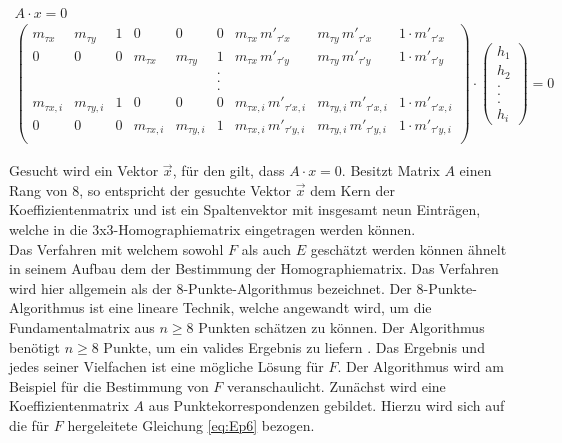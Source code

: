 \begin{gather}
		A\cdot x = 0\\
	\begin{pmatrix}
		m_{\tau x}&m_{\tau y}&1&0&0&0&m_{\tau x}\, m'_{\tau' x}&m_{\tau y} \,m'_{\tau'x} & 1\cdot m'_{\tau'x}\\
		0&0&0&m_{\tau x}&m_{\tau y}&1&m_{\tau x}\, m'_{\tau' y}&m_{\tau y}\, m'_{\tau'y} & 1\cdot m'_{\tau'y}\\
		&&&&&.&&&\\	
		&&&&&.&&&\\	
		&&&&&.&&&\\	
		m_{\tau x,i}&m_{\tau y,i}&1&0&0&0&m_{\tau x,i}\, m'_{\tau'x,i}&m_{\tau y,i}\, m'_{\tau'x,i} & 1\cdot m'_{\tau'x,i}\\
		0&0&0&m_{\tau x,i}&m_{\tau y,i}&1&m_{\tau x,i}\, m'_{\tau'y,i}&m_{\tau y,i}\, m'_{\tau'y,i} & 1\cdot m'_{\tau'y,i}\\
	\end{pmatrix}
	\cdot
	\begin{pmatrix}
		h_1\\h_2\\.\\.\\.\\h_i
	\end{pmatrix}
	=0
\end{gather}

Gesucht wird ein Vektor $\vec{x}$, für den gilt, dass $A \cdot x = 0$. Besitzt Matrix $A$ einen Rang von 8, so entspricht der gesuchte Vektor $\vec{x}$ dem Kern der Koeffizientenmatrix und ist ein Spaltenvektor mit insgesamt neun Einträgen, welche in die 3x3-Homographiematrix eingetragen werden können\cite{HZ,Schwarz}.\\


Das Verfahren mit welchem sowohl $F$ als auch $E$ geschätzt werden können ähnelt in seinem Aufbau dem der Bestimmung der Homographiematrix. Das Verfahren wird hier allgemein als der 8-Punkte-Algorithmus bezeichnet\cite{HZ,Ferid,Zhang2014}. Der 8-Punkte-Algorithmus ist eine lineare Technik, welche angewandt wird, um die Fundamentalmatrix aus  $n \geq 8$ Punkten schätzen zu können. Der Algorithmus benötigt $n \geq 8$ Punkte, um ein valides Ergebnis zu liefern \cite{HZ,Zhang2014,Ferid}. Das Ergebnis und jedes seiner Vielfachen ist eine mögliche Lösung für $F$. Der Algorithmus wird am Beispiel für die Bestimmung von $F$ veranschaulicht. Zunächst wird eine Koeffizientenmatrix $A$ aus Punktekorrespondenzen gebildet. Hierzu wird sich auf die für $F$ hergeleitete Gleichung \ref{eq:Ep6} bezogen.


